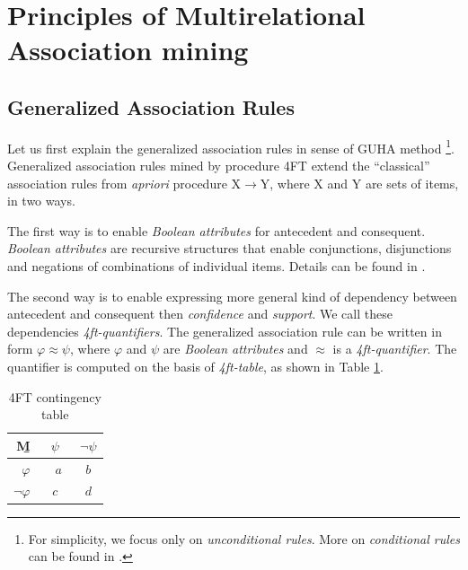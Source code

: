 \documentclass[conference]{IEEEtran}
\begin{document}
\section{Principles of Multirelational Association mining}
\label{section:principles}

\subsection{Generalized Association Rules}
\label{section:generalized}
Let us first explain the generalized association rules in sense of GUHA method
\cite{Rauch1,Rauch2,Alternative}\footnote{For simplicity, we focus only on 
\emph{unconditional rules}. More on \emph{conditional rules} can be found in 
\cite{Rauch2}.}. Generalized association rules mined by procedure 4FT \cite{Alternative}
extend the ``classical'' association rules from \emph{apriori} procedure
X$\rightarrow$Y, where X and Y are sets of items, in two ways. 

The first way is to
enable \emph{Boolean attributes} for antecedent and consequent. \emph{Boolean attributes}
are recursive structures that enable conjunctions, disjunctions and negations of
combinations of individual items. Details can be found in \cite{Ralbovsky}.

The second way is to enable expressing more general kind of dependency between 
antecedent and consequent then \emph{confidence} and \emph{support}. We call these 
dependencies \emph{4ft-quantifiers}. The generalized association rule can be written
in form \mbox{$\varphi \approx \psi$}, where $\varphi$ and $\psi$ are 
\emph{Boolean attributes} and $\approx$ is a \emph{4ft-quantifier}.
The quantifier is computed on the basis of \emph{4ft-table}, as shown in 
Table \ref{table:4FTcontingency}.

\begin{table}[ht]
	\begin{center}
		\begin{tabular}{r|c|c}
		{\b M}        & $ \psi $ &  $ \neg \psi $ \\
		\hline
		     $  \varphi $  &  \ \ $ a  \ \ $    & $  \ \ b \ \  $    \\
		\hline
		   $ \neg \varphi $  &  $ c $    & $ d $    \\
		\end {tabular}
	\end{center}
	\caption{4FT contingency table}
	\label{table:4FTcontingency}
\end{table}
\end{document}
